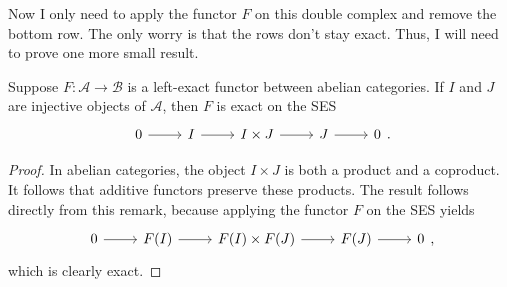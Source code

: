 Now I only need to apply the functor $F$ on this double complex
and remove the bottom row. The only worry is that the rows don't stay
exact. Thus, I will need to prove one more small result.
\begin{lemm}
  Suppose $F:\mathcal{A}\to\mathcal{B}$ is a left-exact functor between
  abelian categories. If $I$ and $J$ are injective objects of $\mathcal{A}$,
  then $F$ is exact on the SES
  \[\begin{tikzcd}
      0\rar & I\rar & I\times J\rar & J\rar & 0
    \end{tikzcd}.\]
\end{lemm}
\begin{proof}
  In abelian categories, the object $I\times J$ is both a product and
  a coproduct. It follows that additive functors preserve these products.
  The result follows directly from this remark, because applying the functor
  $F$ on the SES yields
  \[\begin{tikzcd}
      0\rar & F(I)\rar & F(I)\times F(J)\rar & F(J)\rar & 0
    \end{tikzcd},\]
  which is clearly exact.
\end{proof}

